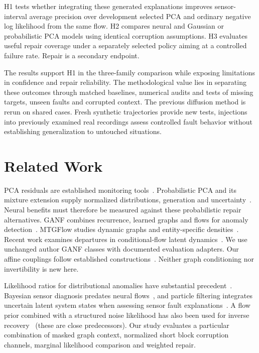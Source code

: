 \documentclass{llncs}
\newcommand{\1}{\mathbf{1}}
\begin{document}
H1 tests whether integrating these generated explanations improves sensor-interval average precision over development selected PCA and ordinary negative log likelihood from the same flow. H2 compares neural and Gaussian or probabilistic PCA models using identical corruption assumptions. H3 evaluates useful repair coverage under a separately selected policy aiming at a controlled failure rate. Repair is a secondary endpoint.

The results support H1 in the three-family comparison while exposing limitations in confidence and repair reliability. The methodological value lies in separating these outcomes through matched baselines, numerical audits and tests of missing targets, unseen faults and corrupted context. The previous diffusion method is rerun on shared cases. Fresh synthetic trajectories provide new tests, injections into previously examined real recordings assess controlled fault behavior without establishing generalization to untouched situations.



\section{Related Work}
PCA residuals are established monitoring tools~\cite{pca}. Probabilistic PCA and its mixture extension supply normalized distributions, generation and uncertainty~\cite{ppca,mppca}. Neural benefits must therefore be measured against these probabilistic repair alternatives.
GANF combines recurrence, learned graphs and flows for anomaly detection~\cite{ganf}. MTGFlow studies dynamic graphs and entity-specific densities~\cite{mtgflow}. Recent work examines departures in conditional-flow latent dynamics~\cite{latentflow}. We use unchanged author GANF classes with documented evaluation adapters. Our affine couplings follow established constructions~\cite{realnvp}. Neither graph conditioning nor invertibility is new here.

Likelihood ratios for distributional anomalies have substantial precedent~\cite{ratio}. Bayesian sensor diagnosis predates neural flows~\cite{bayesfault}, and particle filtering integrates uncertain latent system states when assessing sensor fault explanations~\cite{wright}. A flow prior combined with a structured noise likelihood has also been used for inverse recovery~\cite{whang} (these are close  predecessors). Our study evaluates a particular combination of masked graph context, normalized short block corruption channels, marginal likelihood comparison and weighted repair. 
\end{document}
